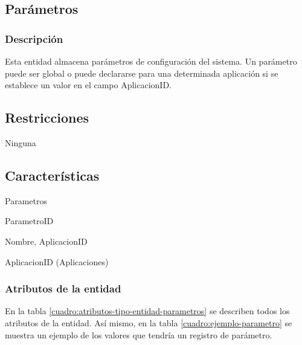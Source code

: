 \subsection{Parámetros}

\subsubsection*{Descripción}
Esta entidad almacena parámetros de configuración del sistema. Un parámetro puede ser global o puede declararse para una determinada aplicación si se establece un valor en el campo AplicacionID.

\subsection*{Restricciones}
Ninguna

\subsection*{Características}
\begin{description}[nosep,style=multiline,labelindent=0.8cm,leftmargin=4.5cm,font=\normalfont]
    \item[Nombre] Parametros
    \item[Id. principal] ParametroID
    \item[Id. alternativo] Nombre, AplicacionID
    \item[Atrib. heredados] AplicacionID (Aplicaciones)
\end{description}

\subsubsection*{Atributos de la entidad}
En la tabla \ref{cuadro:atributos-tipo-entidad-parametros} se describen todos los atributos de la entidad. Así mismo, en la tabla \ref{cuadro:ejemplo-parametro} se muestra un ejemplo de los valores que tendría un registro de parámetro.

